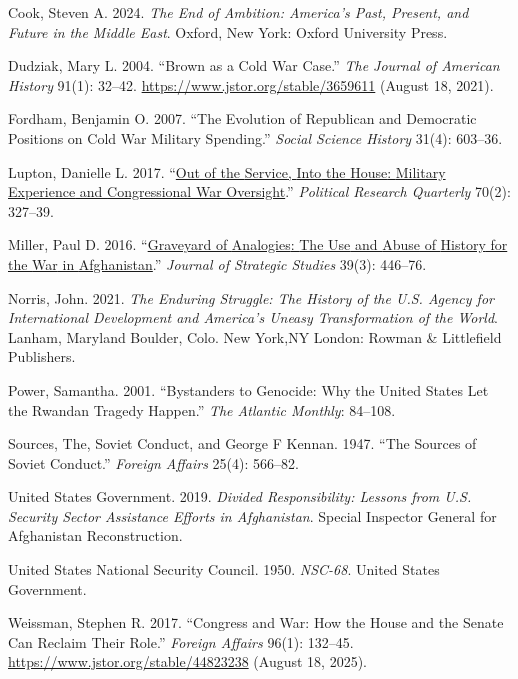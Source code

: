 \documentclass[
  letterpaper,
  DIV=11,
  numbers=noendperiod]{scrartcl}
\newlength{\cslhangindent}
\newenvironment{CSLReferences}[2] %
 {\begin{list}{}{%
  \setlength{\itemindent}{0pt}
  \setlength{\leftmargin}{0pt}
  \setlength{\parsep}{0pt}
  \ifodd #1
   \setlength{\leftmargin}{\cslhangindent}
   \setlength{\itemindent}{-1\cslhangindent}
  \fi
  \setlength{\itemsep}{#2\baselineskip}}}
 {\end{list}}
\begin{document}
\protect{}\label{refs}
\begin{CSLReferences}{1}{1}
Cook, Steven A. 2024. \emph{The {End} of {Ambition}: {America}'s {Past},
{Present}, and {Future} in the {Middle East}}. Oxford, New York: Oxford
University Press.

Dudziak, Mary L. 2004. {``Brown as a {Cold War Case}.''} \emph{The
Journal of American History} 91(1): 32--42.
\url{https://www.jstor.org/stable/3659611} (August 18, 2021).

Fordham, Benjamin O. 2007. {``The Evolution of Republican and Democratic
Positions on Cold War Military Spending.''} \emph{Social Science
History} 31(4): 603--36.

Lupton, Danielle L. 2017.
{``\href{https://doi.org/10.1177/1065912917691359}{Out of the {Service},
{Into} the {House}: {Military Experience} and {Congressional War
Oversight}}.''} \emph{Political Research Quarterly} 70(2): 327--39.

Miller, Paul D. 2016.
{``\href{https://doi.org/10.1080/01402390.2016.1145588}{Graveyard of
{Analogies}: {The Use} and {Abuse} of {History} for the {War} in
{Afghanistan}}.''} \emph{Journal of Strategic Studies} 39(3): 446--76.

Norris, John. 2021. \emph{The {Enduring Struggle}: {The History} of the
{U}.{S}. {Agency} for {International Development} and {America}'s
{Uneasy Transformation} of the {World}}. Lanham, Maryland Boulder, Colo.
New York,NY London: Rowman \& Littlefield Publishers.

Power, Samantha. 2001. {``Bystanders to Genocide: {Why} the United
States Let the Rwandan Tragedy Happen.''} \emph{The Atlantic Monthly}:
84--108.

Sources, The, Soviet Conduct, and George F Kennan. 1947. {``The Sources
of Soviet Conduct.''} \emph{Foreign Affairs} 25(4): 566--82.

United States Government. 2019. \emph{Divided {Responsibility}:
{Lessons} from {U}.{S}. {Security Sector Assistance Efforts} in
{Afghanistan}}. Special Inspector General for Afghanistan
Reconstruction.

United States National Security Council. 1950. \emph{{NSC-68}}. United
States Government.

Weissman, Stephen R. 2017. {``Congress and {War}: {How} the {House} and
the {Senate Can Reclaim Their Role}.''} \emph{Foreign Affairs} 96(1):
132--45. \url{https://www.jstor.org/stable/44823238} (August 18, 2025).

\end{CSLReferences}
\end{document}
